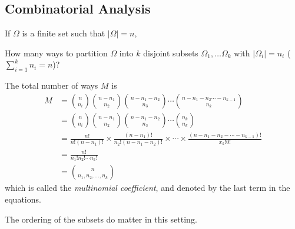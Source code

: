 \subsection{Combinatorial Analysis}
If \(\Omega\) is a finite set such that \(\left\vert \Omega \right\vert = n\),
\begin{problem}
    How many ways to partition \(\Omega\) into \(k\) disjoint subsets \(\Omega_1, \ldots \Omega_k \) with \(\left\vert \Omega_i \right\vert =n_i\) (\(\sum\limits_{i=1}^{k} n_i = n\))?
\end{problem}
The total number of ways \(M\) is
\begin{align*}
    M &= \binom{n}{n_i} \binom{n-n_1}{n_2} \binom{n - n_1 - n_2}{n_3}\cdots \binom{n - n_1 - n_2 \cdots - n_{k - 1}}{n_k}\\
    &= \binom{n}{n_i} \binom{n-n_1}{n_2} \binom{n - n_1 - n_2}{n_3}\cdots \binom{n_k}{n_k}\\
    &= \frac{n!}{n!(n - n_1)!}\times \frac{(n-n_1)!}{n_2!(n-n_{1}-n_2)!}\times \cdots\times \frac{(n - n_1 - n_2 - \cdots - n_{k-1})!}{x_k!0!}\\
    &=\frac{n!}{n_1!n_2!\cdots n_k!}\\
    &=\binom{n}{n_1,n_2, \ldots ,n_k}
\end{align*}
which is called the \textit{multinomial coefficient}, and denoted by the last term in the equations.
\begin{remark}
    The ordering of the subsets do matter in this setting.
\end{remark}

